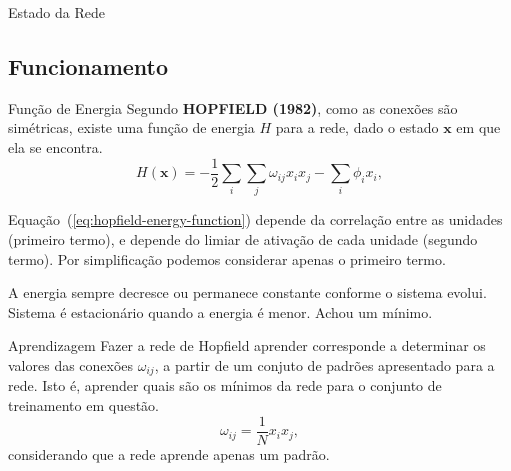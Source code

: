 \begin{frame}{Estado da Rede}%
  \justifying%
\end{frame}

\subsection{Funcionamento}
\begin{frame}{Função de Energia}%
  \justifying%
  Segundo \textbf{HOPFIELD (1982)}, como as conexões são simétricas, existe uma função de energia $H$ para a rede, dado o estado $\mathrm{\mathbf{x}}$ em que ela se encontra.
  \begin{equation}%
    \label{eq:hopfield-energy-function}%
    H(\mathbf{x}) = - \frac{1}{2} \sum_{i} \sum_{j} \omega_{ij} x_{i} x_{j} - \sum_{i} \phi_{i} x_{i},
  \end{equation}
  
  Equação~(\ref{eq:hopfield-energy-function}) depende da correlação entre as unidades (primeiro termo), e depende do limiar de ativação de cada unidade (segundo termo). Por simplificação podemos considerar apenas o primeiro termo.

  A energia sempre decresce ou permanece constante conforme o sistema evolui.
  Sistema é estacionário quando a energia é menor. Achou um mínimo.
\end{frame}

\begin{frame}{Aprendizagem}%
  \justifying%
  Fazer a rede de Hopfield aprender corresponde a determinar os valores das conexões $\omega_{ij}$, a partir de um conjuto de padrões apresentado para a rede. Isto é, aprender quais são os mínimos da rede para o conjunto de treinamento em questão.
  \begin{equation}%
    \label{eq:hop-omega}
    \omega_{ij} = \frac{1}{N} x_{i} x_{j},
  \end{equation}
  considerando que a rede aprende apenas um padrão.
\end{frame}

